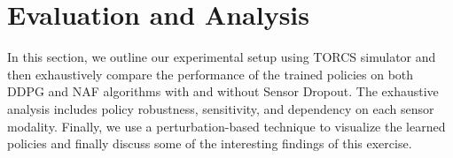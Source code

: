 \documentclass[../thesis.tex]{subfiles}
\begin{document}





\section{Evaluation and Analysis} \label{sec:mdrl-results}
In this section, we outline our experimental setup using TORCS simulator and then exhaustively compare the performance of the trained policies on both DDPG and NAF algorithms with and without Sensor Dropout. The exhaustive analysis includes policy robustness, sensitivity, and dependency on each sensor modality. Finally, we use a perturbation-based technique to visualize the learned policies and finally discuss some of the interesting findings of this exercise.
\end{document}
